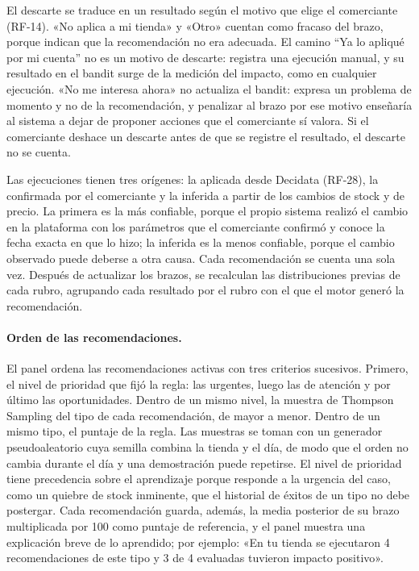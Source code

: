 El descarte se traduce en un resultado según el motivo que elige el comerciante (RF-14). «No aplica a mi tienda» y «Otro» cuentan como fracaso del brazo, porque indican que la recomendación no era adecuada. El camino \enquote{Ya lo apliqué por mi cuenta} no es un motivo de descarte: registra una ejecución manual, y su resultado en el bandit surge de la medición del impacto, como en cualquier ejecución. «No me interesa ahora» no actualiza el bandit: expresa un problema de momento y no de la recomendación, y penalizar al brazo por ese motivo enseñaría al sistema a dejar de proponer acciones que el comerciante sí valora. Si el comerciante deshace un descarte antes de que se registre el resultado, el descarte no se cuenta.

Las ejecuciones tienen tres orígenes: la aplicada desde Decidata (RF-28), la confirmada por el comerciante y la inferida a partir de los cambios de stock y de precio. La primera es la más confiable, porque el propio sistema realizó el cambio en la plataforma con los parámetros que el comerciante confirmó y conoce la fecha exacta en que lo hizo; la inferida es la menos confiable, porque el cambio observado puede deberse a otra causa. Cada recomendación se cuenta una sola vez. Después de actualizar los brazos, se recalculan las distribuciones previas de cada rubro, agrupando cada resultado por el rubro con el que el motor generó la recomendación.

\paragraph{Orden de las recomendaciones.} El panel ordena las recomendaciones activas con tres criterios sucesivos. Primero, el nivel de prioridad que fijó la regla: las urgentes, luego las de atención y por último las oportunidades. Dentro de un mismo nivel, la muestra de Thompson Sampling del tipo de cada recomendación, de mayor a menor. Dentro de un mismo tipo, el puntaje de la regla. Las muestras se toman con un generador pseudoaleatorio cuya semilla combina la tienda y el día, de modo que el orden no cambia durante el día y una demostración puede repetirse. El nivel de prioridad tiene precedencia sobre el aprendizaje porque responde a la urgencia del caso, como un quiebre de stock inminente, que el historial de éxitos de un tipo no debe postergar. Cada recomendación guarda, además, la media posterior de su brazo multiplicada por 100 como puntaje de referencia, y el panel muestra una explicación breve de lo aprendido; por ejemplo: «En tu tienda se ejecutaron 4 recomendaciones de este tipo y 3 de 4 evaluadas tuvieron impacto positivo».

